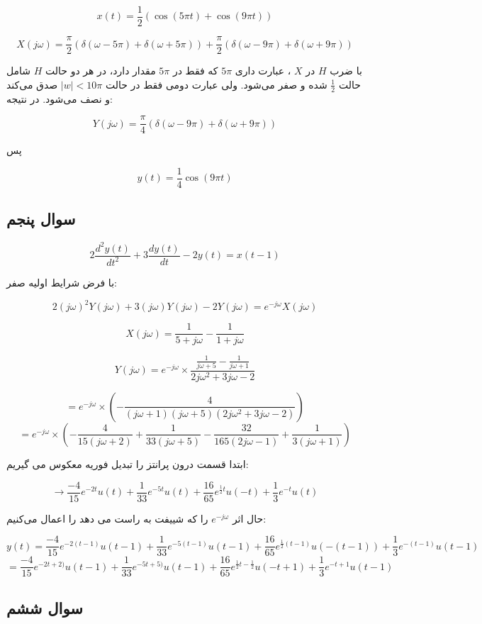 \documentclass[12pt]{article}
\begin{document}
 
 $$x(t) = \frac{1}{2} (\cos (5 \pi  t)+\cos (9 \pi  t))$$
 
 
 $$X(j\omega) = \frac{\pi}{2} (\delta(\omega-5\pi) + \delta(\omega + 5\pi)) + \frac{\pi}{2} (\delta(\omega-9\pi) + \delta(\omega + 9\pi))$$
 
 با ضرب $H$ در $X$ ، عبارت داری $5\pi$ که فقط در $5\pi$ مقدار دارد، در هر دو حالت $H$ شامل حالت $\frac{1}{2}$ شده و صفر می‌شود. ولی عبارت دومی فقط در حالت $|w|<10\pi$ صدق می‌کند و نصف می‌شود. در نتیجه:
 
 $$Y(j\omega) =\frac{\pi}{4} (\delta(\omega-9\pi) + \delta(\omega + 9\pi))$$
 
 پس
 
 $$y(t) = \frac{1}{4} \cos (9 \pi t)$$
 
 
\subsection{سوال پنجم}

$$
2 \frac{d^{2} y(t)}{d t^{2}}+3 \frac{d y(t)}{d t}-2 y(t)=x(t-1)
$$

با فرض شرایط اولیه صفر:

$$2 (j\omega)^2 Y(j\omega) + 3 (j\omega) Y(j\omega) - 2 Y(j\omega) = e^{-j\omega} X(j \omega)$$

$$X(j \omega) = \frac{1}{5 + j\omega} - \frac{1}{1 +j \omega}$$


$$Y(j \omega) = e^{- j \omega} \times \frac{\frac{1}{j\omega+5}-\frac{1}{j\omega+1}}{2 j\omega^2+3 j\omega-2}$$

$$= e^{-j \omega}\times( -\frac{4}{(j\omega+1) (j\omega+5) \left(2 j\omega^2+3 j\omega-2\right)})$$
$$= e^{-j \omega} \times( -\frac{4}{15 (j\omega+2)}+\frac{1}{33 (j\omega+5)}-\frac{32}{165 (2 j\omega-1)}+\frac{1}{3 (j\omega+1)})$$

ابتدا قسمت درون پرانتز را تبدیل فوریه معکوس می گیریم:

$$\rightarrow \frac{-4}{15} e^{-2t}u(t) + \frac{1}{33} e^{-5t}u(t) + \frac{16}{65} e^{\frac{1}{2} t} u(-t) + \frac{1}{3} e^{-t}u(t) $$

حال اثر $e^{-j \omega}$ را که شییفت به راست می دهد را اعمال می‌کنیم:


$$y(t) = \frac{-4}{15} e^{-2(t-1)}u(t-1) + \frac{1}{33} e^{-5(t-1)}u(t-1) + \frac{16}{65} e^{\frac{1}{2} (t-1)} u(-(t-1)) + \frac{1}{3} e^{-(t-1)}u(t-1) $$
$$=\frac{-4}{15} e^{-2t+2)}u(t-1) + \frac{1}{33} e^{-5t+5)}u(t-1) + \frac{16}{65} e^{\frac{1}{2} t-\frac{1}{2}} u(-t+1) + \frac{1}{3} e^{-t+1}u(t-1)$$

\newpage
\subsection{سوال ششم}
\end{document}

